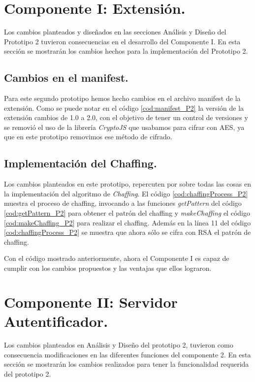 \documentclass[12pt, a4paper, titlepage]{report}
\begin{document}
    	\section{Componente I: Extensión.}
            Los cambios planteados y diseñados en las secciones Análisis y Diseño del Prototipo 2 tuvieron consecuencias en el desarrollo del Componente I. En esta sección se mostrarán los cambios hechos para la implementación del Prototipo 2.
            
            \subsection{Cambios en el manifest.}
                Para este segundo prototipo hemos hecho cambios en el archivo manifest de la extensión. Como se puede notar en el código \ref{cod:manifest_P2} la versión de la extensión cambios de 1.0 a 2.0, con el objetivo de tener un control de versiones y se removió el uso de la librería \textit{CryptoJS} que usabamos para cifrar con AES, ya que en este prototipo removimos ese método de cifrado.
                
                    
            \subsection{Implementación del Chaffing.}
                Los cambios planteados en este prototipo, repercuten por sobre todas las cosas en la implementación del algoritmo de \textit{Chaffing}. El código \ref{cod:chaffingProcess_P2} muestra el proceso de chaffing, invocando a las funciones \textit{getPattern} del código \ref{cod:getPattern_P2} para obtener el patrón del chaffing y \textit{makeChaffing} el código \ref{cod:makeChaffing_P2} para realizar el chaffing. Además en la línea 11 del código \ref{cod:chaffingProcess_P2} se muestra que ahora sólo se cifra con RSA el patrón de chaffing.
                
            
                Con el código mostrado anteriormente, ahora el Componente I es capaz de cumplir con los cambios propuestos y las ventajas que ellos lograron.
            
        \section{Componente II: Servidor Autentificador.}
        
            Los cambios planteados en Análisis y Diseño del prototipo 2, tuvieron como consecuencia modificaciones en las diferentes funciones del componente 2. En esta sección se mostrarán los cambios realizados para tener la funcionalidad requerida del prototipo 2.
        
\end{document}
